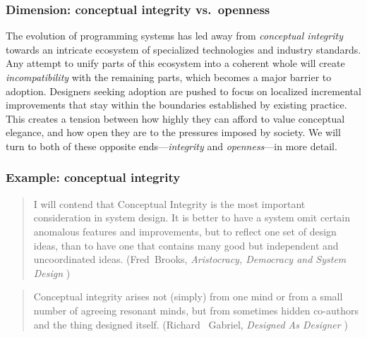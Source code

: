 \documentclass[english,submission]{programming}
\begin{document}
\hypertarget{dimension-conceptual-integrity-vs.-openness}{%
\subsubsection{Dimension: conceptual integrity
vs.~openness}\label{dimension-conceptual-integrity-vs.-openness}}

The evolution of programming systems has led away from \emph{conceptual
integrity} towards an intricate ecosystem of specialized technologies
and industry standards. Any attempt to unify parts of this ecosystem
into a coherent whole will create \emph{incompatibility} with the
remaining parts, which becomes a major barrier to adoption. Designers
seeking adoption are pushed to focus on localized incremental
improvements that stay within the boundaries established by existing
practice. This creates a tension between how highly they can afford to
value conceptual elegance, and how open they are to the pressures
imposed by society. We will turn to both of these opposite
ends---\emph{integrity} and \emph{openness}---in more detail.

\hypertarget{example-conceptual-integrity}{%
\subsubsection{Example: conceptual
integrity}\label{example-conceptual-integrity}}

\begin{quote}
I will contend that Conceptual Integrity is the most important
consideration in system design. It is better to have a system omit
certain anomalous features and improvements, but to reflect one set of
design ideas, than to have one that contains many good but independent
and uncoordinated ideas. (Fred~Brooks, \emph{Aristocracy, Democracy and
System Design} \cite{brooks95aristo})
\end{quote}


\begin{quote}
Conceptual integrity arises not (simply) from one mind or from a small
number of agreeing resonant minds, but from sometimes hidden co-authors
and the thing designed itself. (Richard ~Gabriel, \emph{Designed As
Designer} \cite{DesignedAsDesigner})
\end{quote}
\end{document}
